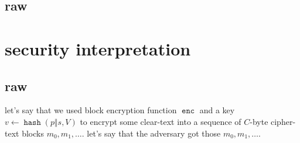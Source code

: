 \documentclass[twocolumn]{article}
\DeclareMathOperator{\enc}{\texttt{enc}}
\DeclareMathOperator{\hash}{\texttt{hash}}
\begin{document}
\subsection{raw}

\section{security interpretation}
\subsection{raw}
let's say that we used block encryption function $\enc$ and a key $v \gets
\hash(p \Vert s, V)$ to encrypt some clear-text into a sequence of
$C$-byte cipher-text blocks $m_0, m_1, \ldots$.  let's say that the
adversary got those $m_0, m_1, \ldots$.
\end{document}
